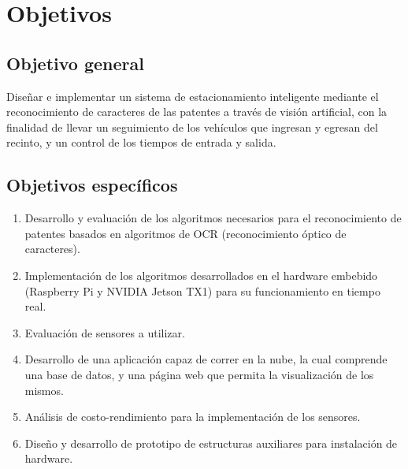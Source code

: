 \section{Objetivos}

\subsection{Objetivo general}

Diseñar e implementar un sistema de estacionamiento inteligente mediante el reconocimiento de caracteres de las patentes a través de visión artificial, con la finalidad de llevar un seguimiento de los vehículos que ingresan y egresan del recinto, y un control de los tiempos de entrada y salida.

\subsection{Objetivos específicos}

\begin{enumerate}
    \item Desarrollo y evaluación de los algoritmos necesarios para el reconocimiento de patentes basados en algoritmos de OCR (reconocimiento óptico de caracteres).
    \item Implementación de los algoritmos desarrollados en el hardware embebido (Raspberry Pi y NVIDIA Jetson TX1) para su funcionamiento en tiempo real.
    \item Evaluación de sensores a utilizar.
    \item Desarrollo de una aplicación capaz de correr en la nube, la cual comprende una base de datos, y una página web que permita la visualización de los mismos.
    \item Análisis de costo-rendimiento para la implementación de los sensores.
    \item Diseño y desarrollo de prototipo de estructuras auxiliares para instalación de hardware.
\end{enumerate}






